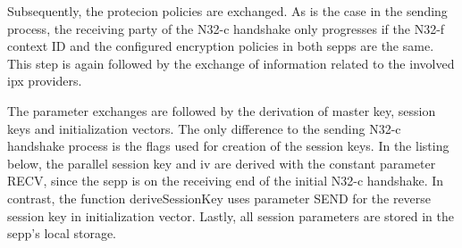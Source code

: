 Subsequently, the protecion policies are exchanged.
As is the case in the sending process, the receiving party of the N32-c handshake only progresses if the N32-f context ID and the configured encryption policies in both \glspl{sepp} are the same.
This step is again followed by the exchange of information related to the involved \gls{ipx} providers.

The parameter exchanges are followed by the derivation of master key, session keys and initialization vectors.
The only difference to the sending N32-c handshake process is the flags used for creation of the session keys.
In the listing below, the parallel session key and \gls{iv} are derived with the constant parameter {\sffamily RECV}, since the \gls{sepp} is on the receiving end of the initial N32-c handshake.
In contrast, the function {\sffamily deriveSessionKey} uses parameter {\sffamily SEND} for the reverse session key in initialization vector.
Lastly, all session parameters are stored in the \gls{sepp}'s local storage.

